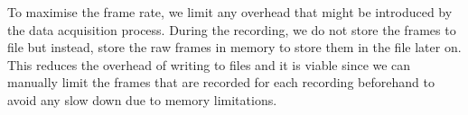 To maximise the frame rate, we limit any overhead that might be introduced by the data acquisition process. During the recording, we do not store the frames to file but instead, store the raw frames in memory to store them in the file later on. This reduces the overhead of writing to files and it is viable since we can manually limit the frames that are recorded for each recording beforehand to avoid any slow down due to memory limitations.


